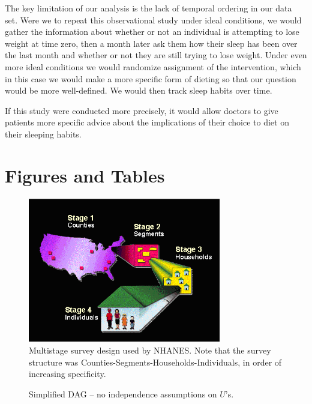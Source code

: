 \documentclass{article}
\begin{document}
The key limitation of our analysis is the lack of temporal ordering in our data set. Were we to repeat this observational study under ideal conditions, we would gather the information about whether or not an individual is attempting to lose weight at time zero, then a month later ask them how their sleep has been over the last month and whether or not they are still trying to lose weight. Under even more ideal conditions we would randomize assignment of the intervention, which in this case we would make a more specific form of dieting so that our question would be more well-defined. We would then track sleep habits over time.

If this study were conducted more precisely, it would allow doctors to give patients more specific advice about the implications of their choice to diet on their sleeping habits.


{}



\appendix
\section{Figures and Tables}

\begin{figure}[hp]
\centering
\includegraphics[width=0.75\textwidth]{figures/Survey_Design.PNG}
\caption{Multistage survey design used by NHANES. Note that the survey structure was Counties-Segments-Households-Individuals, in order of increasing specificity.}
\label{fig:survey.design}
\end{figure}

\begin{figure}[hp]
    \centering
  \caption{Simplified DAG -- no independence assumptions on $U$'s.}
  \label{fig:DAG}
\end{figure}
\end{document}
